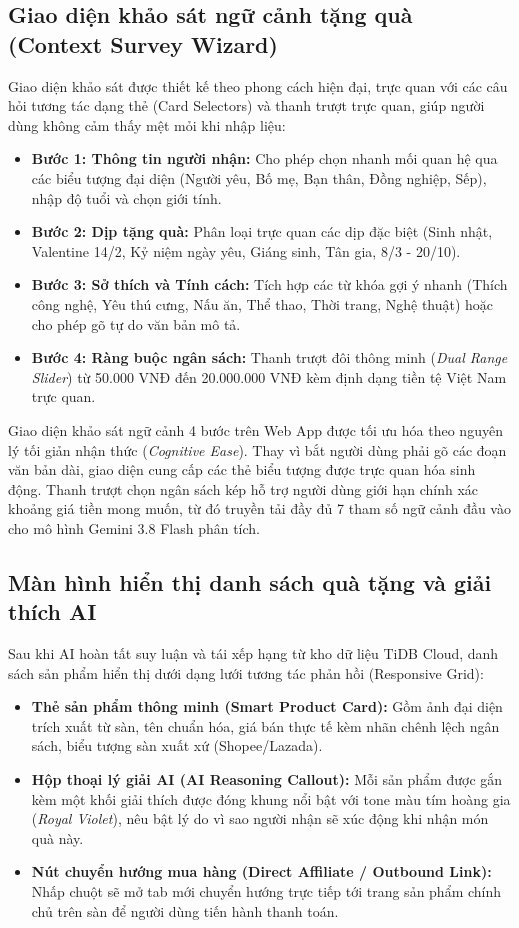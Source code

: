 \subsection{Giao diện khảo sát ngữ cảnh tặng quà (Context Survey Wizard)}
Giao diện khảo sát được thiết kế theo phong cách hiện đại, trực quan với các câu hỏi tương tác dạng thẻ (Card Selectors) và thanh trượt trực quan, giúp người dùng không cảm thấy mệt mỏi khi nhập liệu:
\begin{itemize}
    \item \textbf{Bước 1: Thông tin người nhận:} Cho phép chọn nhanh mối quan hệ qua các biểu tượng đại diện (Người yêu, Bố mẹ, Bạn thân, Đồng nghiệp, Sếp), nhập độ tuổi và chọn giới tính.
    \item \textbf{Bước 2: Dịp tặng quà:} Phân loại trực quan các dịp đặc biệt (Sinh nhật, Valentine 14/2, Kỷ niệm ngày yêu, Giáng sinh, Tân gia, 8/3 - 20/10).
    \item \textbf{Bước 3: Sở thích và Tính cách:} Tích hợp các từ khóa gợi ý nhanh (Thích công nghệ, Yêu thú cưng, Nấu ăn, Thể thao, Thời trang, Nghệ thuật) hoặc cho phép gõ tự do văn bản mô tả.
    \item \textbf{Bước 4: Ràng buộc ngân sách:} Thanh trượt đôi thông minh (\textit{Dual Range Slider}) từ 50.000 VNĐ đến 20.000.000 VNĐ kèm định dạng tiền tệ Việt Nam trực quan.
\end{itemize}

Giao diện khảo sát ngữ cảnh 4 bước trên Web App được tối ưu hóa theo nguyên lý tối giản nhận thức (\textit{Cognitive Ease}). Thay vì bắt người dùng phải gõ các đoạn văn bản dài, giao diện cung cấp các thẻ biểu tượng được trực quan hóa sinh động. Thanh trượt chọn ngân sách kép hỗ trợ người dùng giới hạn chính xác khoảng giá tiền mong muốn, từ đó truyền tải đầy đủ 7 tham số ngữ cảnh đầu vào cho mô hình Gemini 3.8 Flash phân tích.

\subsection{Màn hình hiển thị danh sách quà tặng và giải thích AI}
Sau khi AI hoàn tất suy luận và tái xếp hạng từ kho dữ liệu TiDB Cloud, danh sách sản phẩm hiển thị dưới dạng lưới tương tác phản hồi (Responsive Grid):
\begin{itemize}
    \item \textbf{Thẻ sản phẩm thông minh (Smart Product Card):} Gồm ảnh đại diện trích xuất từ sàn, tên chuẩn hóa, giá bán thực tế kèm nhãn chênh lệch ngân sách, biểu tượng sàn xuất xứ (Shopee/Lazada).
    \item \textbf{Hộp thoại lý giải AI (AI Reasoning Callout):} Mỗi sản phẩm được gắn kèm một khối giải thích được đóng khung nổi bật với tone màu tím hoàng gia (\textit{Royal Violet}), nêu bật lý do vì sao người nhận sẽ xúc động khi nhận món quà này.
    \item \textbf{Nút chuyển hướng mua hàng (Direct Affiliate / Outbound Link):} Nhấp chuột sẽ mở tab mới chuyển hướng trực tiếp tới trang sản phẩm chính chủ trên sàn để người dùng tiến hành thanh toán.
\end{itemize}

